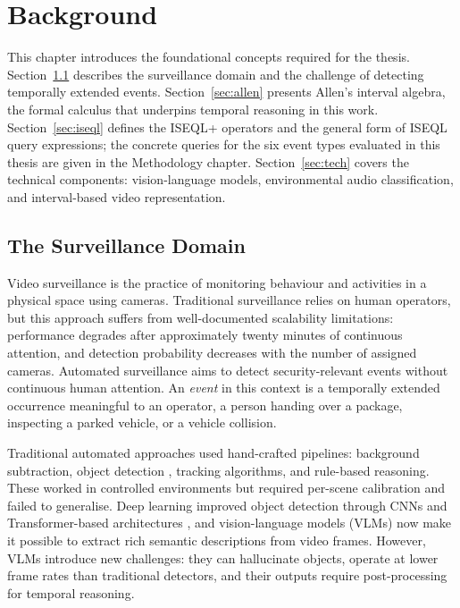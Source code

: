 \chapter{Background}
\label{Background}

This chapter introduces the foundational concepts required for the thesis. Section~\ref{sec:domain} describes the surveillance domain and the challenge of detecting temporally extended events. Section~\ref{sec:allen} presents Allen's interval algebra, the formal calculus that underpins temporal reasoning in this work. Section~\ref{sec:iseql} defines the ISEQL+ operators and the general form of ISEQL query expressions; the concrete queries for the six event types evaluated in this thesis are given in the Methodology chapter. Section~\ref{sec:tech} covers the technical components: vision-language models, environmental audio classification, and interval-based video representation.

\section{The Surveillance Domain}
\label{sec:domain}

Video surveillance is the practice of monitoring behaviour and activities in a physical space using cameras. Traditional surveillance relies on human operators, but this approach suffers from well-documented scalability limitations: performance degrades after approximately twenty minutes of continuous attention, and detection probability decreases with the number of assigned cameras. Automated surveillance aims to detect security-relevant events without continuous human attention. An \textit{event} in this context is a temporally extended occurrence meaningful to an operator, a person handing over a package, inspecting a parked vehicle, or a vehicle collision.

Traditional automated approaches used hand-crafted pipelines: background subtraction, object detection \citep{redmon2016yolo, ren2015fasterrcnn}, tracking algorithms, and rule-based reasoning. These worked in controlled environments but required per-scene calibration and failed to generalise. Deep learning improved object detection through CNNs and Transformer-based architectures \citep{carion2020detr}, and vision-language models (VLMs) now make it possible to extract rich semantic descriptions from video frames. However, VLMs introduce new challenges: they can hallucinate objects, operate at lower frame rates than traditional detectors, and their outputs require post-processing for temporal reasoning.

